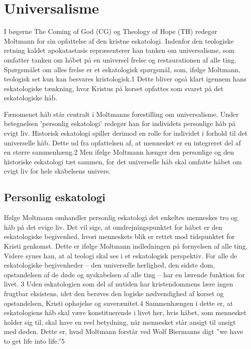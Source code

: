 \chapter{Universalisme}
I bøgerne The Coming of God (CG) og Theology of Hope (TH) redegør Moltmann for sin opfattelse af den kristne eskatologi. Indenfor den teologiske retning kaldet apokatastasis repræsenterer han tanken om universalisme, som omfatter tanken om håbet på en universel frelse og restaurationen af alle ting. Spørgsmålet om alles frelse er et eskatologisk spørgsmål, som, ifølge Moltmann, teologisk set kun kan besvares kristologisk.1 Dette bliver også klart igennem hans eskatologiske tænkning, hvor Kristus på korset opfattes som svaret på det eskatologiske håb.

Fænomenet håb står centralt i Moltmanns forestilling om universalisme. Under betegnelsen 'personlig eskatologi' redegør han for individets personlige håb på evigt liv. Historisk eskatologi spiller derimod en rolle for individet i forhold til det universelle håb. Dette ud fra opfattelsen af, at mennesket er en integreret del af en større sammenhæng.2 Men ifølge Moltmann hænger den personlige og den historiske eskatologi tæt sammen, for det universelle håb skal omfatte håbet om evigt liv for hele skabelsens univers.  

\section{Personlig eskatologi}
Ifølge Moltmann omhandler personlig eskatologi det enkeltes menneskes tro og håb på det evige liv. Det
vil sige, at omdrejningspunktet for håbet er den eskatologiske begivenhed, hvori menneskets blik er rettet mod tidspunktet for Kristi genkomst. Dette er ifølge Moltmann indledningen på fornyelsen af alle ting. Videre synes han, at al teologi skal ses i et eskatologisk perspektiv. For alle de eskatologiske begivenheder -- den universelle herlighed, den sidste dom, opstandelsen af de døde og nyskabelsen af alle ting -- har en lærende funktion for livet. 3 Uden eskatologien som del af nutiden har kristendommens lære ingen frugtbar eksistens, idet den berøves den logiske nødvendighed af korset og opstandelsen, Kristi ophøjelse og suverænitet.4 Sammenhængen i dette er, at eskatologiens håb skal være konstituerende i livet her, hvis håbet, som mennesket holder sig til, skal have en reel betydning, når mennesket står ansigt til ansigt med døden. Dette er, hvad Moltmann forstår ved Wolf Biermanns digt ”we have to get life into life.”5

